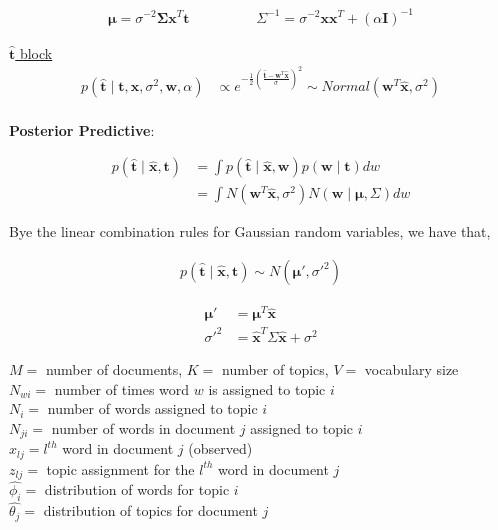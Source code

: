 \documentclass[10pt]{homeworg}
\begin{document}
\vspace{-1cm}

\begin{align*}
\boldsymbol \mu = \sigma^{-2}\boldsymbol \Sigma \boldsymbol x^T \boldsymbol t  \hspace{2cm} \Sigma^{-1} = \sigma^{-2}\boldsymbol x\boldsymbol x^T + (\alpha \boldsymbol I)^{-1}
\end{align*}


\underline{$\hat{\boldsymbol t}$ block}
\begin{align*}
p(\hat{\boldsymbol t} \mid \boldsymbol t, \boldsymbol x, \sigma^2, \boldsymbol w, \alpha) &\propto e^{-\frac{1}{2}(\frac{\hat{\boldsymbol t}-\boldsymbol w^T\hat{\boldsymbol x}}{\sigma})^2} \sim Normal(\boldsymbol w^T\hat{\boldsymbol x}, \sigma^2)
\end{align*}
\\


\textbf{Posterior Predictive}:

\begin{align*}
p(\hat{\boldsymbol t} \mid \hat{\boldsymbol x}, \boldsymbol t) &= \int p(\hat{\boldsymbol t} \mid \hat{\boldsymbol x}, \boldsymbol w)p(\boldsymbol w \mid \boldsymbol t)dw\\
&= \int N(\boldsymbol w^T \hat{\boldsymbol x}, \sigma^2)N(\boldsymbol w \mid \boldsymbol \mu, \Sigma)dw
\end{align*}

Bye the linear combination rules for Gaussian random variables, we have that,

\begin{align*}
p(\hat{\boldsymbol t} \mid \hat{\boldsymbol x}, \boldsymbol t) \sim N(\boldsymbol \mu', \sigma'^2)
\end{align*}

\vspace{-1cm}

\begin{align*}
\boldsymbol \mu' &= \boldsymbol \mu^T\hat{\boldsymbol x}\\
\sigma'^2 &= \hat{\boldsymbol x}^T \Sigma \hat{\boldsymbol x} + \sigma^2
\end{align*}

\exercise
$M = $ number of documents, $K = $ number of topics, $V = $ vocabulary size\\
$N_{wi} = $ number of times word $w$ is assigned to topic $i$\\
$N_i = $ number of words assigned to topic $i$\\
$N_{ji} = $ number of words in document $j$ assigned to topic $i$\\
$x_{lj} = l^{th}$ word in document $j$ (observed)\\
$z_{lj} = $ topic assignment for the $l^{th}$ word in document $j$\\
$\hat{\phi_{i}} = $ distribution of words for topic $i$\\
$\hat{\theta_j} = $ distribution of topics for document $j$\\
\end{document}
